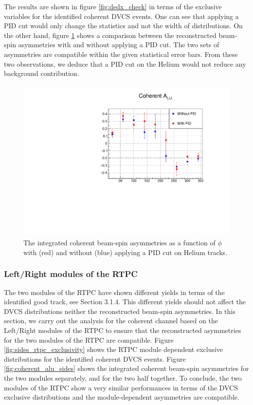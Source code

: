 The results are shown in figure \ref{fig:dedx_check} in terms of the
exclusive variables for the identified coherent DVCS events. One can see that
applying a PID cut would only change the statistics and not the width of
distributions. On the other hand, figure \ref{fig:coh_alu_PID} shows a 
comparison between the reconstructed beam-spin asymmetries with and without 
applying a PID cut. The two sets of asymmetries are compatible within the given 
statistical error bars. From these two observations, we deduce that a PID cut 
on the Helium would not reduce any background contribution.
   \begin{figure}[tbp]
         \centering
         \includegraphics[height=8.2cm]{fig_dvcs/Coh_ALU_W_out_PID.pdf}
         \caption{The integrated coherent beam-spin asymmetries as a function 
         of $\phi$ with (red) and without (blue) applying a PID cut on Helium 
      tracks.}
         \label{fig:coh_alu_PID}
      \end{figure}



\subsubsection{Left/Right modules of the RTPC}
The two modules of the RTPC have shown different yields in terms of the 
identified good track, see Section 3.1.4. This different yields should not 
affect the DVCS distributions neither the reconstructed beam-spin asymmetries.  
In this section, we carry out the analysis for the coherent channel based on 
the Left/Right modules of the RTPC to ensure that the reconstructed asymmetries 
for the two modules of the RTPC are compatible. Figure 
\ref{fig:sides_rtpc_exclusivity} shows the RTPC module dependent exclusive 
distributions for the identified coherent DVCS events. Figure 
\ref{fig:coherent_alu_sides} shows the integrated coherent beam-spin 
asymmetries for the two modules separately, and for the two half together. To 
conclude, the two modules of the RTPC show a very similar performances in terms 
of the DVCS exclusive distributions and the module-dependent asymmetries are 
compatible.

